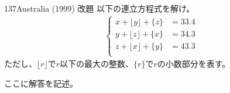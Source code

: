 \begin{prob}{137}{\maru}{Australia (1999) 改題}
 以下の連立方程式を解け。
 \begin{align*}
  \left\{
  \begin{aligned}
   x+\lfloor y \rfloor + \{z\} &= 33.4 \\
   y+\lfloor z \rfloor + \{x\} &= 34.3 \\
   z+\lfloor x \rfloor + \{y\} &= 43.3 \\
  \end{aligned}
  \right.
 \end{align*}
 ただし、$\lfloor r \rfloor$で$r$以下の最大の整数、$\{r\}$で$r$の小数部分を表す。
\end{prob}
ここに解答を記述。